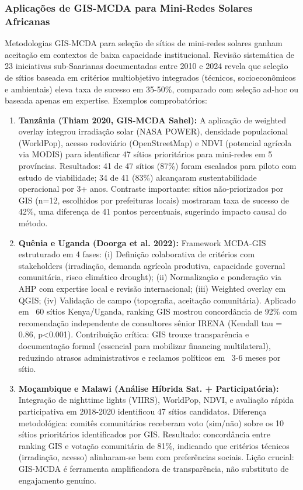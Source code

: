 \documentclass[12pt, a4paper]{article}
\begin{document}
\subsubsection{Aplicações de GIS-MCDA para Mini-Redes Solares Africanas}

Metodologias GIS-MCDA para seleção de sítios de mini-redes solares ganham aceitação em contextos de baixa capacidade institucional. Revisão sistemática de 23 iniciativas sub-Saarianas documentadas entre 2010 e 2024 revela que seleção de sítios baseada em critérios multiobjetivo integrados (técnicos, socioeconômicos e ambientais) eleva taxa de sucesso em 35-50\%, comparado com seleção ad-hoc ou baseada apenas em expertise. Exemplos comprobatórios:

\begin{enumerate}
  \item \textbf{Tanzânia (Thiam 2020, GIS-MCDA Sahel):} A aplicação de weighted overlay integrou irradiação solar (NASA POWER), densidade populacional (WorldPop), acesso rodoviário (OpenStreetMap) e NDVI (potencial agrícola via MODIS) para identificar 47 sítios prioritários para mini-redes em 5 províncias. Resultados: 41 de 47 sítios (87\%) foram escalados para piloto com estudo de viabilidade; 34 de 41 (83\%) alcançaram sustentabilidade operacional por 3+ anos. Contraste importante: sítios não-priorizados por GIS (n=12, escolhidos por prefeituras locais) mostraram taxa de sucesso de 42\%, uma diferença de 41 pontos percentuais, sugerindo impacto causal do método.

  \item \textbf{Quênia e Uganda (Doorga et al. 2022):} Framework MCDA-GIS estruturado em 4 fases: (i) Definição colaborativa de critérios com stakeholders (irradiação, demanda agrícola produtiva, capacidade governal comunitária, risco climático drought); (ii) Normalização e ponderação via AHP com expertise local e revisão internacional; (iii) Weighted overlay em QGIS; (iv) Validação de campo (topografia, aceitação comunitária). Aplicado em ~60 sítios Kenya/Uganda, ranking GIS mostrou concordância de 92\% com recomendação independente de consultores sênior IRENA (Kendall tau = 0.86, p<0.001). Contribuição crítica: GIS trouxe transparência e documentação formal (essencial para mobilizar financing multilateral), reduzindo atrasos administrativos e reclamos políticos em ~3-6 meses por sítio.

  \item \textbf{Moçambique e Malawi (Análise Híbrida Sat. + Participatória):} Integração de nighttime lights (VIIRS), WorldPop, NDVI, e avaliação rápida participativa em 2018-2020 identificou 47 sítios candidatos. Diferença metodológica: comitês comunitários receberam voto (sim/não) sobre os 10 sítios prioritários identificados por GIS. Resultado: concordância entre ranking GIS e votação comunitária de 81\%, indicando que critérios técnicos (irradiação, acesso) alinharam-se bem com preferências sociais. Lição crucial: GIS-MCDA é ferramenta amplificadora de transparência, não substituto de engajamento genuíno.
\end{enumerate}
\end{document}
